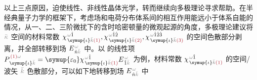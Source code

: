 以上三点原因，迫使线性、非线性晶体光学，转而继续向多极理论寻求帮助。在半经典量子力学的框架下，考虑场和电荷分布体系间的相互作用能远小于体系自能的情况，从一、二、三阶微扰下的含时哈密顿量的微观起源的角度，多极理论建议将 $\mathcolor{gray}{\bar{\kappa}}$ 空间的材料常数 $\chi^{\;\! \mathcolor{gray}{\omega} \hat{1}}_{\;\! \symup{\iota} \mathcolor{gray}{\bar{k}} \textcolor{Maroon}{(1)}}, \chi^{\;\! \mathcolor{gray}{\omega} \hat{1} \hat{2}}_{\;\! \symup{\iota} \mathcolor{gray}{\bar{k}} \textcolor{Maroon}{(2)}}, \chi^{\;\! \mathcolor{gray}{\omega} \hat{1} \hat{2} \hat{3}}_{\;\! \symup{\iota} \mathcolor{gray}{\bar{k}} \textcolor{Maroon}{(3)}}$ 的空间色散部分剥离，并全部转移到场 $E^{\;\!\mathcolor{gray}{\omega}}_{\;\! \hat{n} \mathcolor{gray}{\bar{k}}}$ 中。以  的线性项 $P^{\;\! \textcolor{Maroon}{(1)} \mathcolor{gray}{\omega}}_{\;\! \symup{\iota}\mathcolor{gray}{\bar{k}}} = {\symup{\varepsilon_0}} \chi^{\;\! \mathcolor{gray}{\omega} \hat{1}}_{\;\! \symup{\iota} \mathcolor{gray}{\bar{k}} \textcolor{Maroon}{(1)}} E^{\;\!\mathcolor{gray}{\omega}}_{\;\! \hat{1} \mathcolor{gray}{\bar{k}}}$ 为例，材料常数 $\chi^{\;\! \mathcolor{gray}{\omega} \hat{1}}_{\;\! \symup{\iota} \mathcolor{gray}{\bar{k}} \textcolor{Maroon}{(1)}}$ 的空间/波矢 $\mathcolor{gray}{\bar{k}}$ 色散部分，可以如下地转移到场 $E^{\;\!\mathcolor{gray}{\omega}}_{\;\! \hat{n} \mathcolor{gray}{\bar{k}}}$ 中

